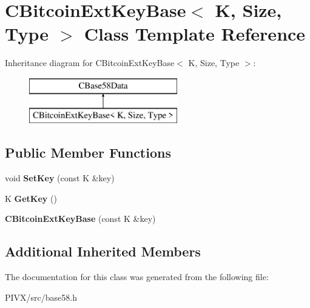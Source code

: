 \hypertarget{class_c_bitcoin_ext_key_base}{}\section{C\+Bitcoin\+Ext\+Key\+Base$<$ K, Size, Type $>$ Class Template Reference}
\label{class_c_bitcoin_ext_key_base}
Inheritance diagram for C\+Bitcoin\+Ext\+Key\+Base$<$ K, Size, Type $>$\+:\begin{figure}[H]
\begin{center}
\leavevmode
\includegraphics[height=2.000000cm]{class_c_bitcoin_ext_key_base}
\end{center}
\end{figure}
\subsection*{Public Member Functions}
\begin{DoxyCompactItemize}
\item 
\mbox{\label{class_c_bitcoin_ext_key_base_aa6041045bb68b3f24d92f5e3b96aeef6}} 
void {\bfseries Set\+Key} (const K \&key)
\item 
\mbox{\label{class_c_bitcoin_ext_key_base_a528399b89529212a44a08250c5f29d68}} 
K {\bfseries Get\+Key} ()
\item 
\mbox{\label{class_c_bitcoin_ext_key_base_a61b09dabc0849ba24520a78c5996096a}} 
{\bfseries C\+Bitcoin\+Ext\+Key\+Base} (const K \&key)
\end{DoxyCompactItemize}
\subsection*{Additional Inherited Members}


The documentation for this class was generated from the following file\+:\begin{DoxyCompactItemize}
\item 
P\+I\+V\+X/src/base58.\+h\end{DoxyCompactItemize}
